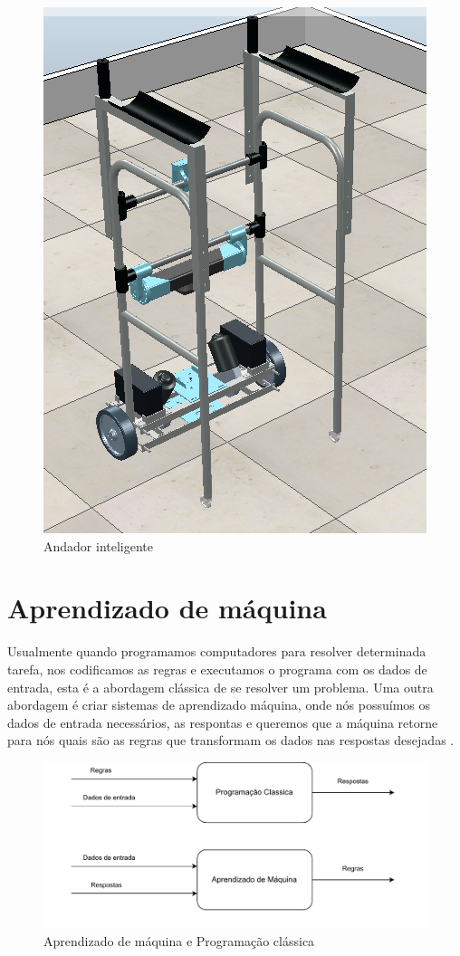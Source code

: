 \begin{figure}[H]
    \centering
    \includegraphics[scale=0.4]{figuras/smart_walker.png}
    \caption{Andador inteligente}
\end{figure}

\section{Aprendizado de máquina}
Usualmente quando programamos computadores para
resolver determinada tarefa, nos codificamos as regras e
executamos o programa com os dados de entrada, esta é a abordagem clássica
de se resolver um problema. Uma outra abordagem
é criar sistemas de aprendizado máquina, onde nós possuímos os
dados de entrada necessários, as respontas e queremos que a máquina retorne
para nós quais são as regras que transformam os dados nas respostas
desejadas \cite{chollet2021deep}.

\begin{figure}[H]
    \centering
    \includegraphics[scale=0.7]{figuras/machine_learning_diagram.pdf}
    \caption{Aprendizado de máquina e Programação clássica}
\end{figure}

